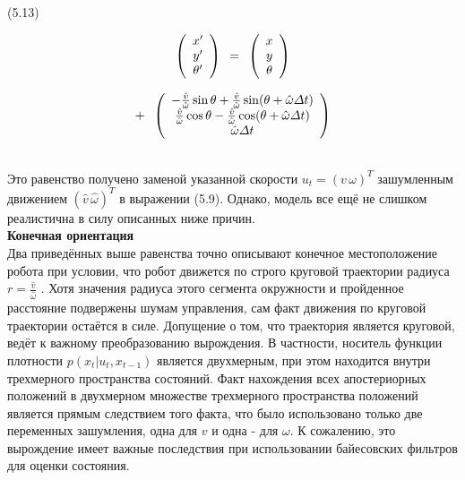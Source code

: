 \documentclass[10pt,a4paper]{article}
\begin{document}
(5.13)
\begin{minipage}{0.3\textwidth}
	\begin{equation*}
	\left(\begin{array}{c}
	x'\\
	y'\\
	\theta'\\
	\end{array}\right)
	\hspace{2mm}
	\mbox {=} \hspace{2mm}\left(\begin{array}{c}
	x\\
	y\\
	\theta\\
	\end{array}\right)
	\end{equation*}
\end{minipage}
\begin{minipage}{0.3\textwidth}
	\begin{equation*}
	\mbox {+} \hspace{2mm} 
	\left(\begin{array}{c}
	-\frac{\hat{v}}{\hat{\omega}}\sin\theta+\frac{\hat{v}}{\hat{\omega}}\sin(\theta+\hat{\omega}\varDelta t)\\
	\frac{\hat{v}}{\hat{\omega}}\cos\theta-\frac{\hat{v}}{\hat{\omega}}\cos(\theta+\hat{\omega}\varDelta t)\\
	\hat{\omega}\varDelta t\\
	\end{array}\right)
	\end{equation*}
\end{minipage}\\

Это равенство получено заменой указанной скорости $u_t = (v\,\omega)^T$ зашумленным движением $(\hat{v}\,\hat{\omega})^T$ в выражении (5.9). Однако, модель все ещё не слишком реалистична в силу описанных ниже причин.\\

\textbf{Конечная ориентация}\\

Два приведённых выше равенства точно описывают конечное местоположение робота при условии, что робот движется по строго круговой траектории радиуса $r=\frac{\hat{v}}{\hat{\omega}}$ . Хотя значения радиуса этого сегмента окружности и пройденное расстояние подвержены шумам управления, сам факт движения по круговой траектории остаётся в силе. Допущение о том, что траектория является круговой, ведёт к важному преобразованию вырождения. В частности, носитель функции плотности $p(x_t | u_t, x_{t-1})$ является двухмерным, при этом находится внутри трехмерного пространства состояний. Факт нахождения всех апостериорных положений в двухмерном множестве трехмерного пространства положений является прямым следствием того факта, что было использовано только две переменных зашумления, одна для $v$ и одна - для $\omega$. К сожалению, это вырождение имеет важные последствия при использовании байесовских фильтров для оценки состояния. 
\end{document}
